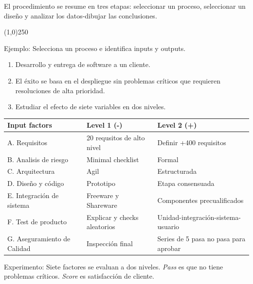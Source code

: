 \documentclass[oneside]{book}
\begin{document}
El procedimiento se resume en tres etapas: seleccionar un proceso, seleccionar un diseño y analizar los datos-dibujar las conclusiones.

\begin{center}
	\line(1,0){250}
\end{center}


Ejemplo:
Selecciona un proceso e identifica inputs y outputs.
\begin{enumerate}
	\item Desarrollo y entrega de software a un cliente.
	\item El éxito se basa en el despliegue sin problemas críticos que requieren resoluciones de alta prioridad.
	\item Estudiar el efecto de siete variables en dos niveles.
\end{enumerate}

\begin{table}[H]
	\begin{center}
\begin{tabular}{|p{5cm}|p{5cm}|p{5cm}|}
	\hline Input factors & Level 1 (-) & Level 2 (+) \\
	\hline A. Requisitos & 20 requsitos de alto nivel & Definir +400 requisitos \\
	\hline B. Analisis de riesgo & Minimal checklist & Formal \\
	\hline C. Arquitectura & Agil & Estructurada \\
	\hline D. Diseño y código & Prototipo & Etapa consensuada \\
	\hline E. Integración de sistema & Freeware y Shareware & Componentes precualificados \\
	\hline F. Test de producto & Explicar y checks aleatorios & Unidad-integración-sistema-usuario \\
	\hline G. Aseguramiento de Calidad & Inspección final & Series de 5 pasa no pasa para aprobar \\
	\hline
\end{tabular}
\end{center}
\end{table}
Experimento: Siete factores se evaluan a dos niveles. \textit{Pass} es que no tiene problemas críticos. \textit{Score} es satisfacción de cliente.
\end{document}
